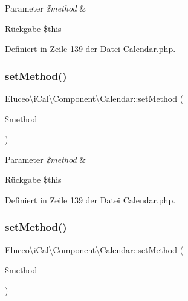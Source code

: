 \begin{DoxyParams}{Parameter}
{\em \$method} & \\
\hline
\end{DoxyParams}
\begin{DoxyReturn}{Rückgabe}
\$this 
\end{DoxyReturn}


Definiert in Zeile 139 der Datei Calendar.\+php.

\mbox{\label{class_eluceo_1_1i_cal_1_1_component_1_1_calendar_a39023ed69e30af7b94799e7677197d16}} 
\subsubsection{\texorpdfstring{set\+Method()}{setMethod()}\hspace{0.1cm}{\footnotesize\ttfamily [2/3]}}
{\footnotesize\ttfamily Eluceo\textbackslash{}i\+Cal\textbackslash{}\+Component\textbackslash{}\+Calendar\+::set\+Method (\begin{DoxyParamCaption}\item[{}]{\$method }\end{DoxyParamCaption})}


\begin{DoxyParams}{Parameter}
{\em \$method} & \\
\hline
\end{DoxyParams}
\begin{DoxyReturn}{Rückgabe}
\$this 
\end{DoxyReturn}


Definiert in Zeile 139 der Datei Calendar.\+php.

\mbox{\label{class_eluceo_1_1i_cal_1_1_component_1_1_calendar_a39023ed69e30af7b94799e7677197d16}} 
\subsubsection{\texorpdfstring{set\+Method()}{setMethod()}\hspace{0.1cm}{\footnotesize\ttfamily [3/3]}}
{\footnotesize\ttfamily Eluceo\textbackslash{}i\+Cal\textbackslash{}\+Component\textbackslash{}\+Calendar\+::set\+Method (\begin{DoxyParamCaption}\item[{}]{\$method }\end{DoxyParamCaption})}


